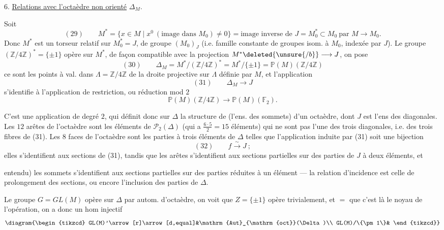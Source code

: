 
6. \uline{Relations avec l'octaèdre non orienté} $\Delta_M$.

Soit
\[
(29)\qquad
M^*=\{x\in M\mid x^0\ (\text{image dans }M_0)\ne0\}
=\text{image inverse de }J=M_0^*\subset M_0\ \text{par }M\longrightarrow M_0.
\]
Donc $M^*$ est un torseur relatif sur $M_0^*=J$, de groupe $(M_0)_J$ (i.e. famille constante de groupes isom. à $M_0$, indexée par $J$). Le groupe $(\mathbb{Z}/4\mathbb{Z})^*=\{\pm1\}$ opère sur $M^*$, de façon compatible avec la projection $M^*\deleted{\unsure{/b}}\longrightarrow J$, on pose
\[
(30)\qquad
\Delta_M=M^*/(\mathbb{Z}/4\mathbb{Z})^*=M^*/\{\pm1\}
=\mathbb{P}(M)(\mathbb{Z}/4\mathbb{Z})
\]
ce sont les points à val. dans $\Lambda=\mathbb{Z}/4\mathbb{Z}$ de la droite projective sur $\Lambda$ définie par $M$, et l'application 
\[
(31)\qquad \Delta_M\longrightarrow J
\]
s'identifie à l'application de restriction, ou réduction mod $2$
\[
\mathbb{P}(M)(\mathbb{Z}/4\mathbb{Z})\longrightarrow\mathbb{P}(M)(\mathbb{F}_2).
\]

C'est une application de degré $2$, qui définit donc sur $\Delta$ la structure de (l'ens. des sommets) d'un octaèdre, dont $J$ est l'ens des diagonales. Les
$12$ arêtes de l'octaèdre sont les éléments de $\mathcal P_2(\Delta)$ (qui a $\frac{6\cdot5}{2}=15$ éléments) qui ne sont pas  l'une des trois diagonales, i.e. des trois fibres de (31). Les $8$ faces de l'octaèdre sont les parties à trois éléments  de $\Delta$ telles que l'application induite par (31) soit une bijection
\[
(32)\qquad f\xrightarrow{\sim}J\ ;
\]
elles s'identifient aux sections de (31), tandis que les arêtes s'identifient aux sections partielles sur des parties de $J$ à deux éléments, et 


entendu) les sommets s'identifient aux sections partielles sur des parties  réduites à un élément — la relation d'incidence est celle de prolongement des sections, ou encore l'inclusion des parties de $\Delta$.

Le groupe $G=GL(M)$ opère sur $\Delta$ par autom. d'octaèdre, on voit que $Z=\{\pm1\}$ opère trivialement,  et $=$ que c'est là le noyau de l'opération, on a donc un hom injectif
\[
\diagram{\begin{tikzcd}
GL(M)'\arrow[r]\arrow[d,equal]&\mathrm{Aut}_{\mathrm{oct}}(\Delta)\\
GL(M)/\{\pm1\}&
\end{tikzcd}}
\]

